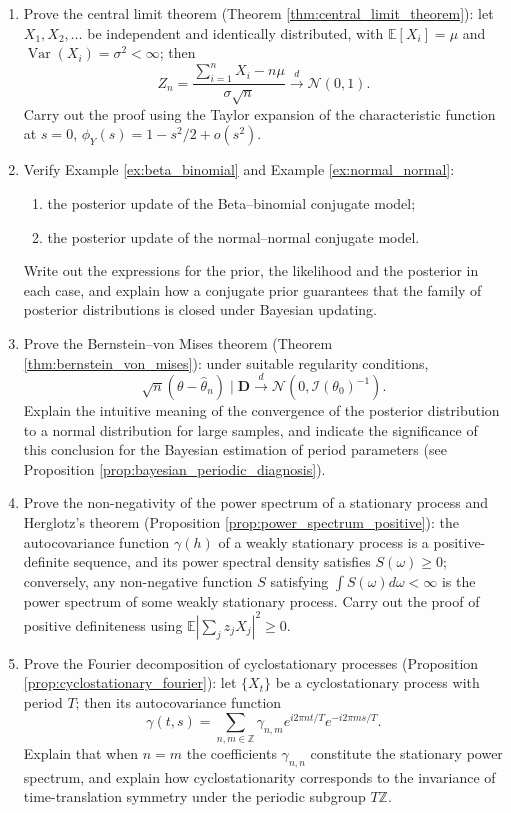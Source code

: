 \begin{enumerate}[leftmargin=3em, label=\textbf{Exercise \arabic*}]
    \item Prove the central limit theorem (Theorem \ref{thm:central_limit_theorem}):
    let $X_1,X_2,\dots$ be independent and identically distributed,
    with $\mathbb{E}[X_i]=\mu$ and $\operatorname{Var}(X_i)=\sigma^2<\infty$;
    then
    \[
    Z_n=\frac{\sum_{i=1}^nX_i-n\mu}{\sigma\sqrt{n}}
    \xrightarrow{d}\mathcal{N}(0,1).
    \]
    Carry out the proof using the Taylor expansion of the characteristic function at $s=0$,
    $\phi_Y(s)=1-s^2/2+o(s^2)$.

    \item Verify Example \ref{ex:beta_binomial} and Example \ref{ex:normal_normal}:
    \begin{enumerate}[label=(\roman*)]
        \item the posterior update of the Beta--binomial conjugate model;
        \item the posterior update of the normal--normal conjugate model.
    \end{enumerate}
    Write out the expressions for the prior, the likelihood and the posterior in each case,
    and explain how a conjugate prior guarantees that the family of posterior distributions is closed under Bayesian updating.

    \item Prove the Bernstein--von Mises theorem (Theorem \ref{thm:bernstein_von_mises}):
    under suitable regularity conditions,
    \[
    \sqrt{n}(\theta-\hat{\theta}_n)\mid\mathbf{D}
    \xrightarrow{d}\mathcal{N}(0,\mathcal{I}(\theta_0)^{-1}).
    \]
    Explain the intuitive meaning of the convergence of the posterior distribution to a normal distribution for large samples,
    and indicate the significance of this conclusion for the Bayesian estimation of period parameters
    (see Proposition \ref{prop:bayesian_periodic_diagnosis}).

    \item Prove the non-negativity of the power spectrum of a stationary process and Herglotz's theorem (Proposition \ref{prop:power_spectrum_positive}):
    the autocovariance function $\gamma(h)$ of a weakly stationary process is a positive-definite sequence,
    and its power spectral density satisfies $S(\omega)\ge0$;
    conversely, any non-negative function $S$ satisfying $\int S(\omega)d\omega<\infty$
    is the power spectrum of some weakly stationary process.
    Carry out the proof of positive definiteness using $\mathbb{E}|\sum_jz_jX_j|^2\ge0$.

    \item Prove the Fourier decomposition of cyclostationary processes (Proposition \ref{prop:cyclostationary_fourier}):
    let $\{X_t\}$ be a cyclostationary process with period $T$; then its autocovariance function
    \[
    \gamma(t,s)=\sum_{n,m\in\mathbb{Z}}\gamma_{n,m}e^{i2\pi nt/T}e^{-i2\pi ms/T}.
    \]
    Explain that when $n=m$ the coefficients $\gamma_{n,n}$ constitute the stationary power spectrum,
    and explain how cyclostationarity corresponds to the invariance of time-translation symmetry under the periodic subgroup $T\mathbb{Z}$.


\end{enumerate}
